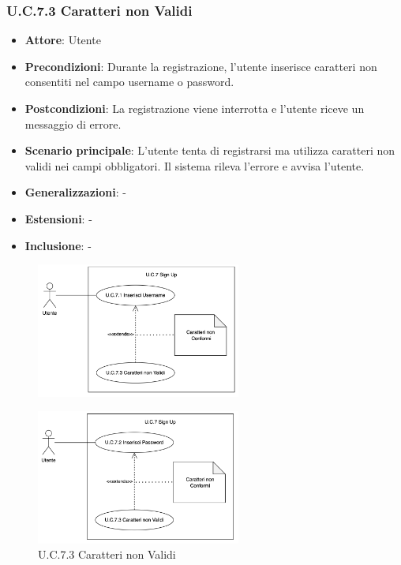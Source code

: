 \subsubsection{U.C.7.3 Caratteri non Validi}
\begin{itemize}
    \item \textbf{Attore}: Utente
    \item \textbf{Precondizioni}: Durante la registrazione, l'utente inserisce caratteri non consentiti nel campo username o password.
    \item \textbf{Postcondizioni}: La registrazione viene interrotta e l'utente riceve un messaggio di errore.
    \item \textbf{Scenario principale}: L'utente tenta di registrarsi ma utilizza caratteri non validi nei campi obbligatori. Il sistema rileva l'errore e avvisa l'utente.
    \item \textbf{Generalizzazioni}: -
    \item \textbf{Estensioni}: -
    \item \textbf{Inclusione}: -
\end{itemize}
\begin{figure}[H]
    \centering
    \includegraphics[width=0.6\textwidth]{img/UC7.3.1.png}
\end{figure}
\begin{figure}[H]
    \centering
    \includegraphics[width=0.6\textwidth]{img/UC7.3.2.png}
    \caption{U.C.7.3 Caratteri non Validi}
\end{figure}
\newpage

